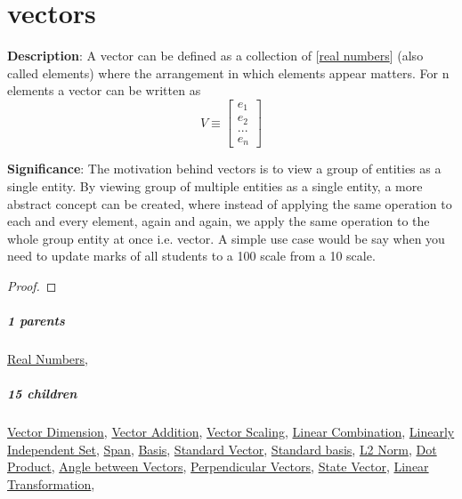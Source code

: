 \documentclass[../main.tex]{subfiles}
\newcommand{\bvecn}[1]{\begin{bmatrix} #1_1 \\ #1_2 \\ ... \\ #1_n \end{bmatrix}}
\begin{document}
\chapter{vectors}


\begin{statement}
\label{statement:Vector}\hspace*{0pt}\par
\end{statement}
\textbf{Description}:
  A vector can be defined as a collection of [\hyperref[statement:Real Numbers]{real numbers}] (also called elements) where the arrangement in which elements appear matters.
  For n elements a vector can be written as \[ V \equiv \bvecn{e} \]
\par
{\color{magenta} \textbf{Significance}:
  The motivation behind vectors is to view a group of entities as a single entity.
  By viewing group of multiple entities as a single entity, a more abstract concept can be created, where instead of applying the same operation to each and every element, again and again, we apply the same operation to the whole group entity at once i.e. vector.
  A simple use case would be say when you need to update marks of all students to a 100 scale from a 10 scale.
\par}
\begin{proof}
\proofbydefinition
\end{proof}\par
\paragraph{1 parents} \hyperref[statement:Real Numbers]{Real Numbers}, 
\paragraph{15 children} \hyperref[statement:Vector Dimension]{Vector Dimension}, \hyperref[statement:Vector Addition]{Vector Addition}, \hyperref[statement:Vector Scaling]{Vector Scaling}, \hyperref[statement:Linear Combination]{Linear Combination}, \hyperref[statement:Linearly Independent Set]{Linearly Independent Set}, \hyperref[statement:Span]{Span}, \hyperref[statement:Basis]{Basis}, \hyperref[statement:Standard Vector]{Standard Vector}, \hyperref[statement:Standard basis]{Standard basis}, \hyperref[statement:L2 Norm]{L2 Norm}, \hyperref[statement:Dot Product]{Dot Product}, \hyperref[statement:Angle between Vectors]{Angle between Vectors}, \hyperref[statement:Perpendicular Vectors]{Perpendicular Vectors}, \hyperref[statement:State Vector]{State Vector}, \hyperref[statement:Linear Transformation]{Linear Transformation}, 
\end{document}
